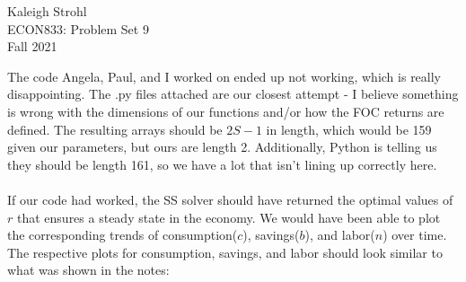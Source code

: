 \documentclass[12pt]{article}
\begin{document}
\begin{center}
Kaleigh Strohl \\
ECON833: Problem Set 9 \\
Fall 2021
\end{center}

\noindent The code Angela, Paul, and I worked on ended up not working, which is really disappointing. The .py files attached are our closest attempt - I believe something is wrong with the dimensions of our functions and/or how the FOC returns are defined. The resulting arrays should be \(2S-1\) in length, which would be 159 given our parameters, but ours are length 2. Additionally, Python is telling us they should be length 161, so we have a lot that isn't lining up correctly here.\\\\
\noindent If our code had worked, the SS solver should have returned the optimal values of \(r\) that ensures a steady state in the economy. We would have been able to plot the corresponding trends of consumption(\(c\)), savings(\(b\)), and labor(\(n\)) over time. The respective plots for consumption, savings, and labor should look similar to what was shown in the notes: 
\end{document}
